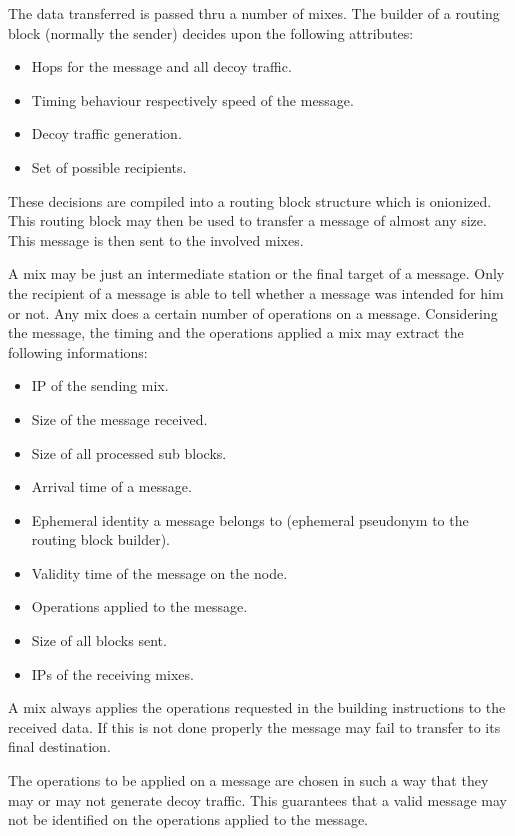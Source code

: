 The data transferred is passed thru a number of mixes. The builder of a routing block (normally the sender) decides upon the following attributes:
\begin{itemize}
	\item Hops for the message and all decoy traffic.
	\item Timing behaviour respectively speed of the message.
	\item Decoy traffic generation.
	\item Set of possible recipients.
\end{itemize}

These decisions are compiled into a routing block structure which is onionized. This routing block may then be used to transfer a message of almost any size. This message is then sent to the involved mixes.

A mix may be just an intermediate station or the final target of a message. Only the recipient of a message is able to tell whether a message was intended for him or not. Any mix does a certain number of operations on a message. Considering the message, the timing and the operations applied a mix may extract the following informations:

\begin{itemize}
	\item IP of the sending mix.
	\item Size of the message received.
	\item Size of all processed sub blocks.
	\item Arrival time of a message.
	\item Ephemeral identity a message belongs to (ephemeral pseudonym to the routing block builder).
	\item Validity time of the message on the node.
	\item Operations applied to the message.
	\item Size of all blocks sent.
	\item IPs of the receiving mixes.
\end{itemize}

A mix always applies the operations requested in the building instructions to the received data. If this is not done properly the message may fail to transfer to its final destination. 

The operations to be applied on a message are chosen in such a way that they may or may not generate decoy traffic. This guarantees that a valid message may not be identified on the operations applied to the message.

